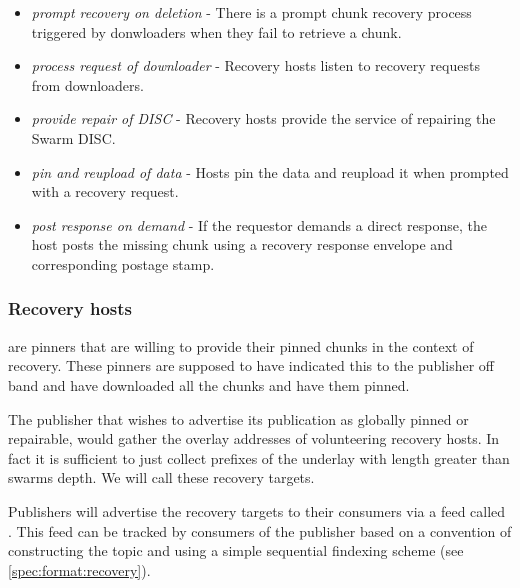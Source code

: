 \begin{itemize}
\item \emph{prompt recovery on deletion} - There is a prompt chunk recovery process triggered by donwloaders when they fail to retrieve a chunk.
\item \emph{process request of downloader} - Recovery hosts listen to recovery requests from downloaders.
\item \emph{provide repair of DISC} - 
Recovery hosts provide the service of repairing the Swarm DISC.
\item \emph{pin and reupload of data} -     
Hosts pin the data and reupload it when prompted with a recovery request. 
\item \emph{post response on demand}  - If the requestor demands a direct response, the host posts the missing chunk using a recovery response envelope and corresponding postage stamp.
\end{itemize}

\subsubsection{Recovery hosts}

 are pinners that are willing to provide their pinned chunks in the context of recovery. These pinners are supposed to have indicated this to the publisher off band and have downloaded all the chunks and have them pinned. 

The publisher that wishes to advertise its publication as globally pinned or repairable, would gather the overlay addresses of volunteering recovery hosts. In fact it is sufficient to just collect prefixes of the underlay with length greater than swarms depth. We will call these recovery targets.

Publishers will advertise the recovery targets to their consumers via a feed called . This feed can be tracked by consumers of the publisher based on a convention of constructing the topic and using a simple sequential findexing scheme (see \ref{spec:format:recovery}). 

